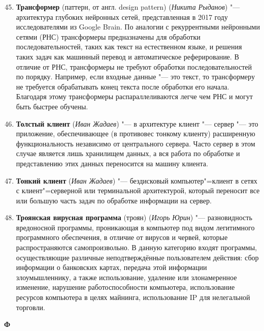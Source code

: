 \begin{enumerate}
\setcounter{enumi}{44}
 
     \item \textbf{Трансформер}  (паттерн, от англ. design pattern) (\textit{Никита Рыданов}) "--- 
      архитектура глубоких нейронных сетей, представленная в 2017 году исследователями из Google Brain. По аналогии с рекуррентными нейронными сетями (РНС) трансформеры предназначены для обработки последовательностей, таких как текст на естественном языке, и решения таких задач как машинный перевод и автоматическое реферирование. В отличие от РНС, трансформеры не требуют обработки последовательностей по порядку. Например, если входные данные "--- это текст, то трансформеру не требуется обрабатывать конец текста после обработки его начала. Благодаря этому трансформеры распараллеливаются легче чем РНС и могут быть быстрее обучены.

      \item \textbf{Толстый клиент} (\textit{Иван Жадаев}) "--- 
     в архитектуре клиент "--- сервер "--- это приложение, обеспечивающее (в противовес тонкому клиенту) расширенную функциональность независимо от центрального сервера. Часто сервер в этом случае является лишь хранилищем данных, а вся работа по обработке и представлению этих данных переносится на машину клиента.

    \item \textbf{Тонкий клиент} (\textit{Иван Жадаев}) "--- 
     бездисковый компьютер"=клиент в сетях с клиент"=серверной или терминальной архитектурой, который переносит все или большую часть задач по обработке информации на сервер.
     
     \item \textbf{Троянская вирусная программа} (троян) (\textit{Игорь Юрин}) "--- 
    разновидность вредоносной программы, проникающая в компьютер под видом легитимного программного обеспечения, в отличие от вирусов и червей, которые распространяются самопроизвольно. В данную категорию входят программы, осуществляющие различные неподтверждённые пользователем действия: сбор информации о банковских картах, передача этой информации злоумышленнику, а также использование, удаление или злонамеренное изменение, нарушение работоспособности компьютера, использование ресурсов компьютера в целях майнинга, использование IP для нелегальной торговли.
     
\end{enumerate}

\begin{flushleft} \large\textbf{Ф} \end{flushleft}

